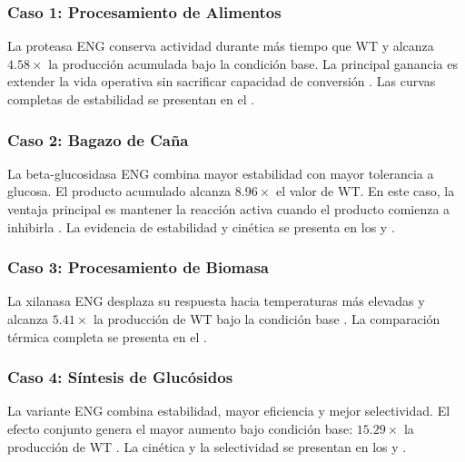 \subsubsection{Caso 1: Procesamiento de Alimentos}

La proteasa ENG conserva actividad durante más tiempo que WT y alcanza
\(4.58\times\) la producción acumulada bajo la condición base. La principal
ganancia es extender la vida operativa sin sacrificar capacidad de conversión
\citep{yuan_apre2709_2025}. Las curvas completas de estabilidad se presentan en
el .

\subsubsection{Caso 2: Bagazo de Caña}

La beta-glucosidasa ENG combina mayor estabilidad con mayor tolerancia a glucosa.
El producto acumulado alcanza \(8.96\times\) el valor de WT. En este caso, la
ventaja principal es mantener la reacción activa cuando el producto comienza a
inhibirla \citep{cao_ks5a7_2018}. La evidencia de estabilidad y cinética se
presenta en los  y .

\subsubsection{Caso 3: Procesamiento de Biomasa}

La xilanasa ENG desplaza su respuesta hacia temperaturas más elevadas y alcanza
\(5.41\times\) la producción de WT bajo la condición base
\citep{zhang_xylanase_2010}. La comparación térmica completa se presenta en el
.

\subsubsection{Caso 4: Síntesis de Glucósidos}

La variante ENG combina estabilidad, mayor eficiencia y mejor selectividad. El
efecto conjunto genera el mayor aumento bajo condición base:
\(15.29\times\) la producción de WT \citep{yin_bgl1d_2019}. La cinética y la
selectividad se presentan en los  y
.

